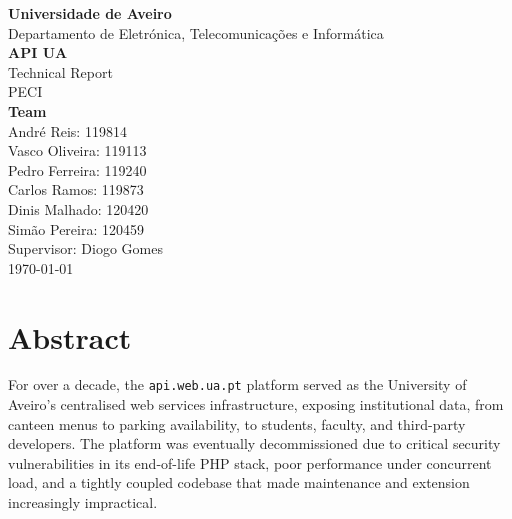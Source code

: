 \documentclass[12pt, a4paper]{report}
\begin{document}

\begin{titlepage}
    \centering
    \vspace*{1cm}

    {\large \textbf{Universidade de Aveiro}}\\[0.3cm]
    {\large Departamento de Eletrónica, Telecomunicações e Informática}\\[2cm]

    {\LARGE \textbf{API UA}}\\[0.5cm]
    {\large Technical Report}\\[0.5cm]
    {\large PECI}\\[2cm]

    {\large \textbf{Team}}\\[0.2cm]
    {\large André Reis: 119814}\\[0.2cm]
    {\large Vasco Oliveira: 119113}\\[0.2cm]
    {\large Pedro Ferreira: 119240}\\[0.2cm]
    {\large Carlos Ramos: 119873}\\[0.2cm]
    {\large Dinis Malhado: 120420}\\[0.2cm]
    {\large Simão Pereira: 120459}\\[2cm]

    {\large Supervisor: Diogo Gomes}\\[2cm]

    {\large \today}

    \vfill
\end{titlepage}


\chapter*{Abstract}

For over a decade, the \texttt{api.web.ua.pt} platform served as the University of
Aveiro's centralised web services infrastructure, exposing institutional data, from
canteen menus to parking availability, to students, faculty, and third-party
developers. The platform was eventually decommissioned due to critical security
vulnerabilities in its end-of-life PHP stack, poor performance under concurrent load,
and a tightly coupled codebase that made maintenance and extension increasingly
impractical.
\end{document}
